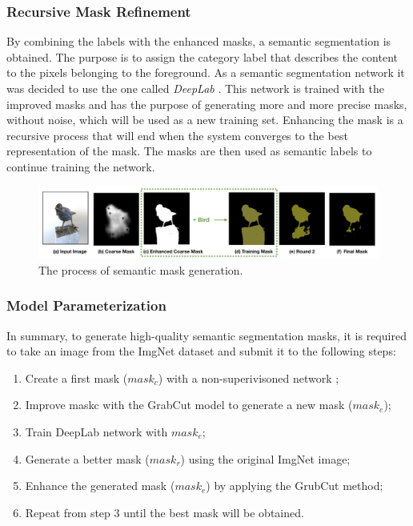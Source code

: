 \subsubsection{Recursive Mask Refinement}
By combining the labels with the enhanced masks, a semantic segmentation 
is obtained. The purpose is to assign the category label that describes the 
content to the pixels belonging to the foreground. As a semantic segmentation 
network it was decided to use the one called \emph{DeepLab} \cite{0876055502}. This network 
is trained with the improved masks and has the purpose of generating more and more 
precise masks, without noise, which will be used as a new training 
set. Enhancing the mask is a recursive process that will end when the system 
converges to the best representation of the mask. The masks are then used 
as semantic labels to continue training the network.
\begin{figure}[h!]
    \centering
    \includegraphics[width = 1 \linewidth]{images/paper6/DeepLab.png}
    \centering
    \caption{The process of semantic mask generation.}
    \label{fig:semanticWork}
\end{figure}

\subsubsection{Model Parameterization}
In summary, to generate high-quality semantic segmentation masks, it is 
required to take an image from the ImgNet dataset and submit it to the 
following steps:
\begin{enumerate}
    \item Create a first mask ($ mask_c $) with a non-superivisoned network \cite{0876055520};
    \item Improve maskc with the GrabCut model \cite{0876055542} to generate a new mask ($ mask_e $);
    \item Train DeepLab network \cite{0876055502} with $ mask_e $;
    \item Generate a better mask ($ mask_r $) using the original ImgNet image;
    \item Enhance the generated mask ($ mask_e $) by applying the GrubCut method;
    \item Repeat from step 3 until the best mask will be obtained.
\end{enumerate}

